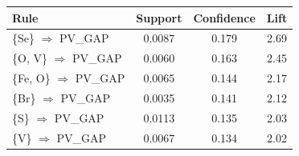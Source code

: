 \begin{tabular}{lccc}
\toprule
Rule & Support & Confidence & Lift\\
\midrule
\{Se\} $\Rightarrow$ PV\_GAP & 0.0087 & 0.179 & 2.69 \\
\{O, V\} $\Rightarrow$ PV\_GAP & 0.0060 & 0.163 & 2.45 \\
\{Fe, O\} $\Rightarrow$ PV\_GAP & 0.0065 & 0.144 & 2.17 \\
\{Br\} $\Rightarrow$ PV\_GAP & 0.0035 & 0.141 & 2.12 \\
\{S\} $\Rightarrow$ PV\_GAP & 0.0113 & 0.135 & 2.03 \\
\{V\} $\Rightarrow$ PV\_GAP & 0.0067 & 0.134 & 2.02 \\
\bottomrule
\end{tabular}
